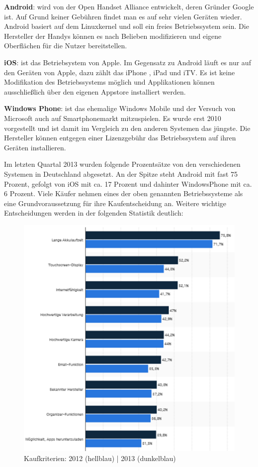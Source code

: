 \textbf{Android}: wird von  der Open Handset Alliance entwickelt, deren Gründer Google ist. Auf Grund keiner Gebühren findet man es  auf sehr vielen Geräten wieder. Android basiert auf dem Linuxkernel und soll ein freies Betriebssystem sein. Die Hersteller der Handys können es nach Belieben modifizieren und eigene Oberflächen für die Nutzer bereitstellen.

\textbf{iOS}: ist das Betriebsystem von Apple. Im Gegensatz zu Android läuft es nur auf den Geräten von Apple, dazu zählt das iPhone , iPad und iTV. Es ist keine Modifikation des Betriebssystems möglich und Applikationen können ausschließlich über den eigenen Appstore installiert werden.
 
\textbf{Windows Phone}: ist das ehemalige Windows Mobile und der Versuch von Microsoft auch auf Smartphonemarkt mitzuspielen. Es wurde erst 2010 vorgestellt und ist damit im Vergleich zu den anderen Systemen das jüngste. Die Hersteller können entgegen einer Lizenzgebühr das Betriebssystem auf ihren Geräten installieren.


Im letzten Quartal 2013 wurden folgende Prozentsätze von den verschiedenen Systemen in Deutschland abgesetzt. An der Spitze steht Android mit fast 75 Prozent, gefolgt von iOS mit ca. 17 Prozent und dahinter WindowsPhone mit ca. 6 Prozent.
Viele Käufer nehmen eines der oben genannten Betriebssysteme als  eine Grundvoraussetzung für ihre Kaufentscheidung an. Weitere wichtige Entscheidungen werden in der folgenden Statistik deutlich:

\begin{figure}[H]
\centering
\includegraphics[width=0.7\linewidth]{../images/statista2.png}
\caption{Kaufkriterien: 2012 (hellblau) | 2013 (dunkelblau)}
\label{fig:stat2}
\end{figure}


